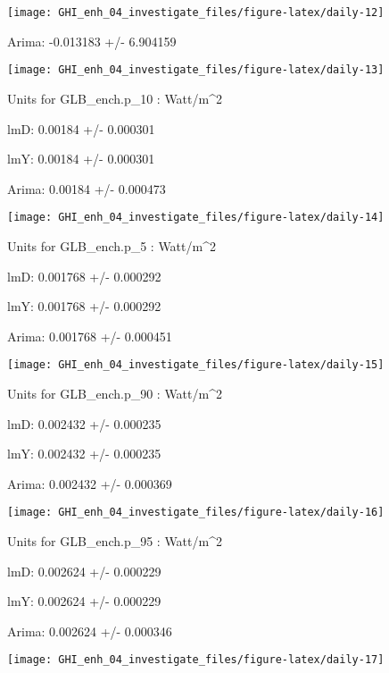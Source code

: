 \documentclass[
  10pt,
  a4paper,oneside]{article}
\begin{document}
\begin{center}\texttt{[image: GHI\_enh\_04\_investigate\_files/figure-latex/daily-12]} \end{center}

Arima: -0.013183 +/- 6.904159

\begin{center}\texttt{[image: GHI\_enh\_04\_investigate\_files/figure-latex/daily-13]} \end{center}

Units for GLB\_ench.p\_10 : Watt/m\^{}2

lmD: 0.00184 +/- 0.000301

lmY: 0.00184 +/- 0.000301

Arima: 0.00184 +/- 0.000473

\begin{center}\texttt{[image: GHI\_enh\_04\_investigate\_files/figure-latex/daily-14]} \end{center}

Units for GLB\_ench.p\_5 : Watt/m\^{}2

lmD: 0.001768 +/- 0.000292

lmY: 0.001768 +/- 0.000292

Arima: 0.001768 +/- 0.000451

\begin{center}\texttt{[image: GHI\_enh\_04\_investigate\_files/figure-latex/daily-15]} \end{center}

Units for GLB\_ench.p\_90 : Watt/m\^{}2

lmD: 0.002432 +/- 0.000235

lmY: 0.002432 +/- 0.000235

Arima: 0.002432 +/- 0.000369

\begin{center}\texttt{[image: GHI\_enh\_04\_investigate\_files/figure-latex/daily-16]} \end{center}

Units for GLB\_ench.p\_95 : Watt/m\^{}2

lmD: 0.002624 +/- 0.000229

lmY: 0.002624 +/- 0.000229

Arima: 0.002624 +/- 0.000346

\begin{center}\texttt{[image: GHI\_enh\_04\_investigate\_files/figure-latex/daily-17]} \end{center}
\end{document}

